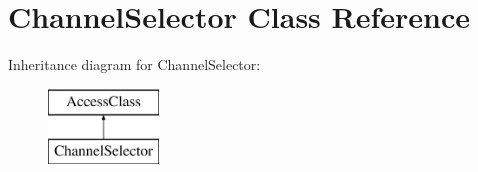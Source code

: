 \hypertarget{classChannelSelector}{\section{Channel\-Selector Class Reference}
\label{classChannelSelector}
}
Inheritance diagram for Channel\-Selector\-:\begin{figure}[H]
\begin{center}
\leavevmode
\includegraphics[height=2.000000cm]{classChannelSelector}
\end{center}
\end{figure}
